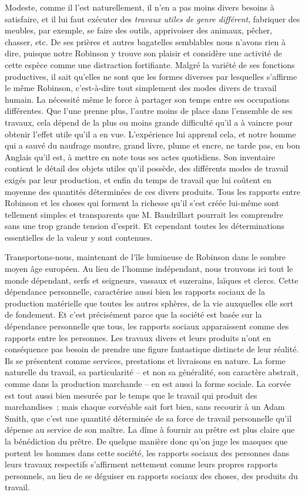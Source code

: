 \documentclass[french,twoside]{book} %
\begin{document}
Modeste, comme il l’est naturellement, il n’en a pas moins divers besoins à satisfaire, et il lui faut exécuter des \emph{travaux utiles de genre différent}, fabriquer des meubles, par exemple, se faire des outils, apprivoiser des animaux, pêcher, chasser, etc. De ses prières et autres bagatelles semblables nous n’avons rien à dire, puisque notre Robinson y trouve son plaisir et considère une activité de cette espèce comme une distraction fortifiante. Malgré la variété de ses fonctions productives, il sait qu’elles ne sont que les formes diverses par lesquelles s’affirme le même Robinson, c’est-à-dire tout simplement des modes divers de travail humain. La nécessité même le force à partager son temps entre ses occupations différentes. Que l’une prenne plus, l’autre moins de place dans l’ensemble de ses travaux, cela dépend de la plus ou moins grande difficulté qu’il a à vaincre pour obtenir l’effet utile qu’il a en vue. L’expérience lui apprend cela, et notre homme qui a sauvé du naufrage montre, grand livre, plume et encre, ne tarde pas, en bon Anglais qu’il est, à mettre en note tous ses actes quotidiens. Son inventaire contient le détail des objets utiles qu’il possède, des différents modes de travail exigés par leur production, et enfin du temps de travail que lui coûtent en moyenne des quantités déterminées de ces divers produits. Tous les rapports entre Robinson et les choses qui forment la richesse qu’il s’est créée lui-même sont tellement simples et transparents que M. Baudrillart pourrait les comprendre sans une trop grande tension d’esprit. Et cependant toutes les déterminations essentielles de la valeur y sont contenues.\par
Transportons-nous, maintenant de l’île lumineuse de Robinson dans le sombre moyen âge européen. Au lieu de l’homme indépendant, nous trouvons ici tout le monde dépendant, serfs et seigneurs, vassaux et suzerains, laïques et clercs. Cette dépendance personnelle, caractérise aussi bien les rapports sociaux de la production matérielle que toutes les autres sphères, de la vie auxquelles elle sert de fondement. Et c’est précisément parce que la société est basée sur la dépendance personnelle que tous, les rapports sociaux apparaissent comme des rapports entre les personnes. Les travaux divers et leurs produits n’ont en conséquence pas besoin de prendre une figure fantastique distincte de leur réalité. Ils se présentent comme services, prestations et livraisons en nature. La forme naturelle du travail, sa particularité – et non sa généralité, son caractère abstrait, comme dans la production marchande – en est aussi la forme sociale. La corvée est tout aussi bien mesurée par le temps que le travail qui produit des marchandises ; mais chaque corvéable sait fort bien, sans recourir à un Adam Smith, que c’est une quantité déterminée de sa force de travail personnelle qu’il dépense au service de son maître. La dîme à fournir au prêtre est plus claire que la bénédiction du prêtre. De quelque manière donc qu’on juge les masques que portent les hommes dans cette société, les rapports sociaux des personnes dans leurs travaux respectifs s’affirment nettement comme leurs propres rapports personnels, au lieu de se déguiser en rapports sociaux des choses, des produits du travail.\par
\end{document}
